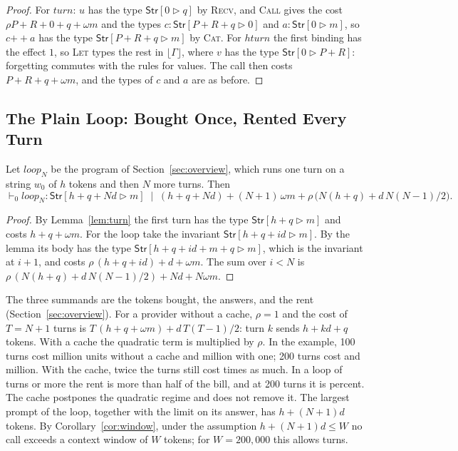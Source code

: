 \documentclass[acmsmall,nonacm,screen]{acmart}
\newcommand{\kw}[1]{\mathsf{#1}}
\newcommand{\Str}[2]{\kw{Str}[#1 \triangleright #2]}
\newcommand{\cat}{\mathbin{+\!\!+}}
\newcommand{\fl}[1]{\lfloor #1 \rfloor}
\newcommand{\nm}[1]{\mathit{#1}}
\newcommand{\turn}{\nm{turn}}
\newcommand{\hturn}{\nm{hturn}}
\begin{document}
\begin{proof}
For $\turn$: $u$ has the type $\Str{0}{q}$ by \textsc{Recv}, and \textsc{Call} gives the cost
$\rho P + R + 0 + q + \omega m$ and the types $c : \Str{P+R+q}{0}$ and $a : \Str{0}{m}$, so
$c \cat a$ has the type $\Str{P+R+q}{m}$ by \textsc{Cat}. For $\hturn$ the first binding has
the effect $1$, so \textsc{Let} types the rest in $\fl{\Gamma}$, where $v$ has the type
$\Str{0}{P+R}$: forgetting commutes with the rules for values. The call then costs
$P + R + q + \omega m$, and the types of $c$ and $a$ are as before.
\end{proof}

\subsection{The Plain Loop: Bought Once, Rented Every Turn}
\label{sec:plain}

\begin{corollary}
\label{cor:plain}
Let $\nm{loop}_N$ be the program of Section~\ref{sec:overview}, which runs one turn on a
string $w_0$ of $h$ tokens and then $N$ more turns. Then
\[
\vdash_0 \nm{loop}_N : \Str{h + q + Nd}{m} \;\mid\;
(h + q + Nd) + (N+1)\,\omega m + \rho\,\bigl(N(h+q) + d\,N(N-1)/2\bigr) .
\]
\end{corollary}

\begin{proof}
By Lemma~\ref{lem:turn} the first turn has the type $\Str{h+q}{m}$ and costs
$h + q + \omega m$. For the loop take the invariant $\Str{h + q + id}{m}$. By the lemma its
body has the type $\Str{h + q + id + m + q}{m}$, which is the invariant at $i + 1$, and costs
$\rho\,(h + q + id) + d + \omega m$. The sum over $i < N$ is
$\rho\,(N(h+q) + d\,N(N-1)/2) + Nd + N\omega m$.
\end{proof}

The three summands are the tokens bought, the answers, and the rent
(Section~\ref{sec:overview}). For a provider without a cache, $\rho = 1$ and the cost of
$T = N + 1$ turns is $T\,(h + q + \omega m) + d\,T(T-1)/2$: turn $k$ sends $h + kd + q$ tokens.
With a cache the quadratic term is multiplied by $\rho$. In the example, 100 turns cost
\exBareHundred{} million units without a cache and \exCostHundred{} million with one; 200 turns
cost \exBareTwoHundred{} and \exCostTwoHundred{} million. With the cache, twice the turns
still cost \exDouble{} times as much. In a loop of \exCross{} turns or more the rent is more
than half of the bill, and at 200 turns it is \exRentShare{} percent. The cache postpones the
quadratic regime and does not remove it. The largest prompt of the loop, together with the limit on its answer,
has $h + (N+1)d$ tokens. By Corollary~\ref{cor:window}, under the assumption
$h + (N+1)d \le W$ no call exceeds a context window of $W$ tokens; for $W = 200{,}000$ this
allows \exFeasible{} turns.
\end{document}
